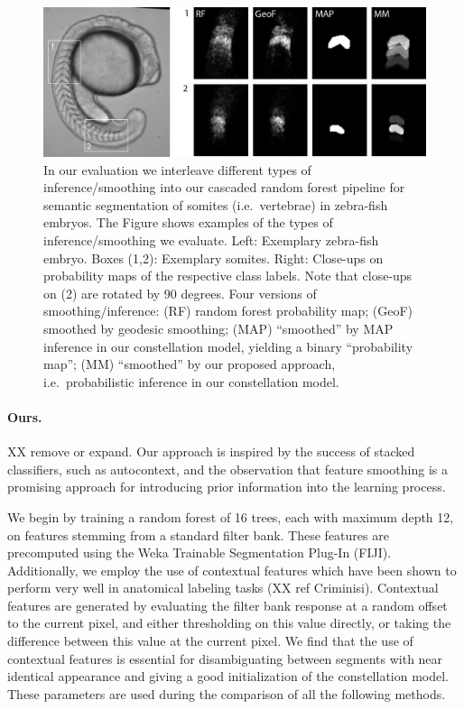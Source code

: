 \documentclass[10pt,twocolumn,letterpaper]{article}
\begin{document}
\begin{figure}[t]
\begin{center}
\includegraphics[width=\columnwidth]{smoothing.jpg} %
\caption{In our evaluation we interleave different types of inference/smoothing into our cascaded random forest pipeline for semantic segmentation of somites (i.e.\ vertebrae) in zebra-fish embryos. 
%
The Figure shows examples of the types of inference/smoothing we evaluate. 
Left: Exemplary zebra-fish embryo. Boxes (1,2): Exemplary somites. Right: Close-ups on probability maps of the respective class labels. Note that close-ups on (2) are rotated by 90 degrees. 
%
Four versions of smoothing/inference: (RF) random forest probability map; (GeoF) smoothed by geodesic smoothing\cite{GeoF2013}; (MAP) "`smoothed"' by MAP inference in our constellation model, yielding a binary "`probability map"'; 
%
(MM) "`smoothed"' by our proposed approach, i.e.\ probabilistic inference in our constellation model.  }
\label{fig:smoothing}
\end{center}
\end{figure}
%


\paragraph{Ours. }

XX remove or expand.  Our approach is inspired by the success of stacked classifiers, such as autocontext, and the observation that feature smoothing is a promising approach for introducing prior information into the learning process.

We begin by training a random forest of 16 trees, each with maximum depth 12, on features stemming from a standard filter bank.  These features are precomputed using the Weka Trainable Segmentation Plug-In (FIJI).  Additionally, we employ the use of contextual features which have been shown to perform very well in anatomical labeling tasks (XX ref Criminisi).  Contextual features are generated by evaluating the filter bank response at a random offset to the current pixel, and either thresholding on this value directly, or taking the difference between this value at the current pixel.  We find that the use of contextual features is essential for disambiguating between segments with near identical appearance and giving a good initialization of the constellation model.  These parameters are used during the comparison of all the following methods.
\end{document}

